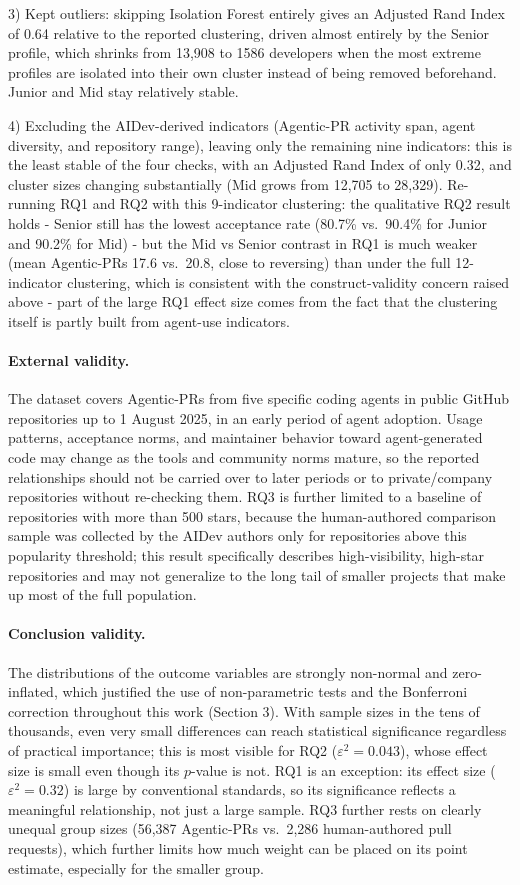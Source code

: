3) Kept outliers: skipping Isolation Forest entirely gives an Adjusted Rand Index of 0.64 relative to the reported clustering, driven almost entirely by the Senior profile, which shrinks from 13,908 to 1586 developers when the most extreme profiles are isolated into their own cluster instead of being removed beforehand. Junior and Mid stay relatively stable.

4) Excluding the AIDev-derived indicators (Agentic-PR activity span, agent diversity, and repository range), leaving only the remaining nine indicators: this is the least stable of the four checks, with an Adjusted Rand Index of only 0.32, and cluster sizes changing substantially (Mid grows from 12,705 to 28,329). Re-running RQ1 and RQ2 with this 9-indicator clustering: the qualitative RQ2 result holds - Senior still has the lowest acceptance rate (80.7\% vs.\ 90.4\% for Junior and 90.2\% for Mid) - but the Mid vs Senior contrast in RQ1 is much weaker (mean Agentic-PRs 17.6 vs.\ 20.8, close to reversing) than under the full 12-indicator clustering, which is consistent with the construct-validity concern raised above - part of the large RQ1 effect size comes from the fact that the clustering itself is partly built from agent-use indicators.

\paragraph{External validity.}
The dataset covers Agentic-PRs from five specific coding agents in public GitHub repositories up to 1 August 2025, in an early period of agent adoption. Usage patterns, acceptance norms, and maintainer behavior toward agent-generated code may change as the tools and community norms mature, so the reported relationships should not be carried over to later periods or to private/company repositories without re-checking them. RQ3 is further limited to a baseline of repositories with more than 500 stars, because the human-authored comparison sample was collected by the AIDev authors only for repositories above this popularity threshold; this result specifically describes high-visibility, high-star repositories and may not generalize to the long tail of smaller projects that make up most of the full population.

\paragraph{Conclusion validity.}
The distributions of the outcome variables are strongly non-normal and zero-inflated, which justified the use of non-parametric tests and the Bonferroni correction throughout this work (Section 3). With sample sizes in the tens of thousands, even very small differences can reach statistical significance regardless of practical importance; this is most visible for RQ2 ($\varepsilon^2=0.043$), whose effect size is small even though its $p$-value is not. RQ1 is an exception: its effect size ($\varepsilon^2=0.32$) is large by conventional standards, so its significance reflects a meaningful relationship, not just a large sample. RQ3 further rests on clearly unequal group sizes (56,387 Agentic-PRs vs.\ 2,286 human-authored pull requests), which further limits how much weight can be placed on its point estimate, especially for the smaller group.
